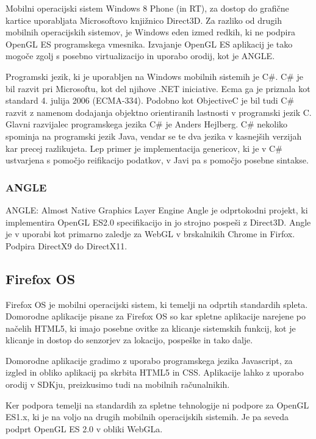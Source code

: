 Mobilni operacijski sistem Windows 8 Phone (in RT), za dostop do grafične kartice uporabljata Microsoftovo knjižnico Direct3D. Za razliko od drugih mobilnih operacijskih sistemov, je Windows eden izmed redkih, ki ne podpira OpenGL ES programskega vmesnika. Izvajanje OpenGL ES aplikacij je tako mogoče zgolj s posebno virtualizacijo in uporabo orodij, kot je ANGLE.

Programski jezik, ki je uporabljen na Windows mobilnih sistemih je C\#. C\# je bil razvit pri Microsoftu, kot del njihove .NET iniciative. Ecma ga je priznala kot standard 4. julija 2006 (ECMA-334). Podobno kot ObjectiveC je bil tudi C\# razvit z namenom dodajanja objektno orientiranih lastnosti v programski jezik C. Glavni razvijalec programskega jezika C\# je Anders Hejlberg. C\# nekoliko spominja na programski jezik Java, vendar se te dva jezika v kasnejših verzijah kar precej razlikujeta. Lep primer je implementacija genericov, ki je v C\# ustvarjena s pomočjo reifikacijo podatkov, v Javi pa s pomočjo posebne sintakse. 

\subsubsection{ANGLE}
ANGLE: Almost Native Graphics Layer Engine
Angle je odprtokodni projekt, ki implementira OpenGL ES2.0 specifikacijo in jo strojno pospeši z Direct3D. Angle je v uporabi kot primarno zaledje za WebGL v brskalnikih Chrome in Firfox. Podpira DirectX9 do DirectX11.  


\subsection{Firefox OS}

Firefox OS je mobilni operacijski sistem, ki temelji na odprtih standardih spleta. Domorodne aplikacije pisane za Firefox OS so kar spletne aplikacije narejene po načelih HTML5, ki imajo posebne ovitke za klicanje sistemskih funkcij, kot je klicanje in dostop do senzorjev za lokacijo, pospeške in tako dalje.

Domorodne aplikacije gradimo z uporabo programskega jezika Javascript, za izgled in obliko aplikacij pa skrbita HTML5 in CSS. Aplikacije lahko z uporabo orodij v SDKju, preizkusimo tudi na mobilnih računalnikih.

Ker podpora temelji na standardih za spletne tehnologije ni podpore za OpenGL ES1.x, ki je na voljo na drugih mobilnih operacijskih sistemih. Je pa seveda podprt OpenGL ES 2.0 v obliki WebGLa.

